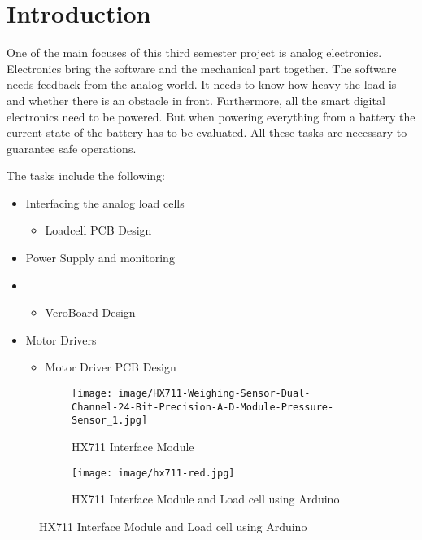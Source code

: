 \documentclass[../report.tex]{subfiles}
\begin{document}
\maketitle

\section*{Introduction}

One of the main focuses of this third semester project is analog electronics. Electronics bring the software and the mechanical part together. 
The software needs feedback from the analog world. It needs to know how heavy the load is and
whether there is an obstacle in front. Furthermore, all the smart digital electronics need to be powered. 
But when powering everything from a battery the current state of the battery has to be evaluated.
All these tasks are necessary to guarantee safe operations.

\quad
The tasks include the following:

\begin{itemize}
    \item Interfacing the analog load cells
    \begin{itemize}
      \item Loadcell PCB Design
    \end{itemize} 
    \item Power Supply and monitoring
    \item \begin{itemize}
      \item VeroBoard Design
    \end{itemize}
    \item Motor Drivers
    \begin{itemize}
      \item Motor Driver PCB Design
    \end{itemize}  
\end{itemize}

\begin{figure}[h!]
    \centering
    \begin{subfigure}[b]{0.4\linewidth}
      \texttt{[image: image/HX711-Weighing-Sensor-Dual-Channel-24-Bit-Precision-A-D-Module-Pressure-Sensor\_1.jpg]}
      \caption{HX711 Interface Module }
    \end{subfigure}
    \begin{subfigure}[b]{0.4\linewidth}
      \texttt{[image: image/hx711-red.jpg]}
      \caption{HX711 Interface Module and Load cell using Arduino}
    \end{subfigure}
    
    
  \end{figure}
  
\end{document}

